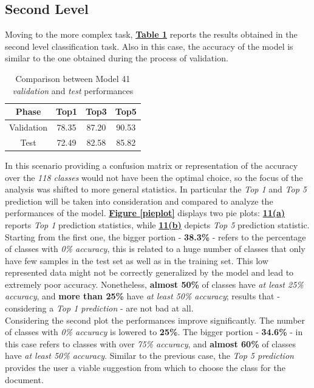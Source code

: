 \documentclass[12pt]{article}
\begin{document}
\subsection{Second Level}
Moving to the more complex task, \hyperref[tb:secondtest]{\textbf{Table \ref{tb:secondtest}}} reports the results obtained in the second level classification task. Also in this case, the accuracy of the model is similar to the one obtained during the process of validation.
\begin{table}[ht!]
    \begin{adjustwidth}{}{}
	    \centering
	    \small
	    \begin{tabular}{ |c|c|c|c| }
        \hline
        \textbf{Phase} & \textbf{Top1} & \textbf{Top3} & \textbf{Top5}\\
        \hline
        Validation & 78.35 & 87.20 & 90.53\\
        Test & 72.49 & 82.58 & 85.82\\
        \hline
        \end{tabular}
    \end{adjustwidth}
    \captionsetup{justification   = centering}
    \caption{Comparison between Model 41 \\\textit{validation} and \textit{test} performances}
    \label{tb:secondtest}
\end{table}

\pagebreak
In this scenario providing a confusion matrix or representation of the accuracy over the \textit{118 classes} would not have been the optimal choice, so the focus of the analysis was shifted to more general statistics. In particular the \textit{Top 1} and \textit{Top 5} prediction will be taken into consideration and compared to analyze the performances of the model. \hyperref[pieplot]{\textbf{Figure \ref{pieplot}}} displays two pie plots: \hyperref[a]{\textbf{11(a)}} reports \textit{Top 1} prediction statistics, while \hyperref[b]{\textbf{11(b)}} depicts \textit{Top 5} prediction statistic.\\
Starting from the first one, the bigger portion - \textbf{38.3\%} - refers to the percentage of classes with \textit{0\% accuracy}, this is related to a huge number of classes that only have few samples in the test set as well as in the training set. This low represented data might not be correctly generalized by the model and lead to extremely poor accuracy. Nonetheless, \textbf{almost 50\%} of classes have \textit{at least 25\% accuracy}, and \textbf{more than 25\%} have \textit{at least 50\% accuracy}; results that - considering a \textit{Top 1 prediction} - are not bad at all.\\
Considering the second plot the performances improve significantly. The number of classes with \textit{0\% accuracy} is lowered to \textbf{25\%}. The bigger portion - \textbf{34.6\%} - in this case refers to classes with over \textit{75\% accuracy}, and \textbf{almost 60\%} of classes have \textit{at least 50\% accuracy}. Similar to the previous case, the \textit{Top 5 prediction} provides the user a viable suggestion from which to choose the class for the document.
\end{document}
